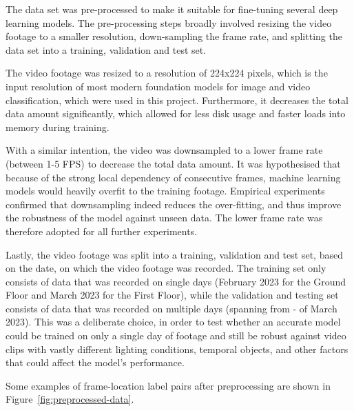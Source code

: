 \documentclass{article}
\begin{document}
  The data set was pre-processed to make it suitable for fine-tuning several deep
  learning models. The pre-processing steps broadly involved resizing the video
  footage to a smaller resolution, down-sampling the frame rate, and splitting
  the data set into a training, validation and test set.

  The video footage was resized to a resolution of 224x224 pixels, which is the
  input resolution of most modern foundation models for image and video
  classification, which were used in this project. Furthermore, it decreases the 
  total data amount significantly, which allowed for less disk usage and faster
  loads into memory during training.

  With a similar intention, the video was downsampled to a lower frame rate
  (between 1-5 FPS) to decrease the total data amount. It was hypothesised that
  because of the strong local dependency of consecutive frames, machine learning
  models would heavily overfit to the training footage. Empirical experiments
  confirmed that downsampling indeed reduces the over-fitting, and thus improve
  the robustness of the model against unseen data. The lower frame rate was
  therefore adopted for all further experiments.

  Lastly, the video footage was split into a training, validation and test set,
  based on the date, on which the video footage was recorded. The training set
  only consists of data that was recorded on single days (February  2023
  for the Ground Floor and March  2023 for the First Floor), while the
  validation and testing set consists of data that was recorded on multiple days
  (spanning from - of March 2023). This was a deliberate choice,
  in order to test whether an accurate model could be trained on only a single
  day of footage and still be robust against video clips with vastly different
  lighting conditions, temporal objects, and other factors that could affect the
  model's performance.

  Some examples of frame-location label pairs after preprocessing are shown in
  Figure~\ref{fig:preprocessed-data}.
\end{document}
